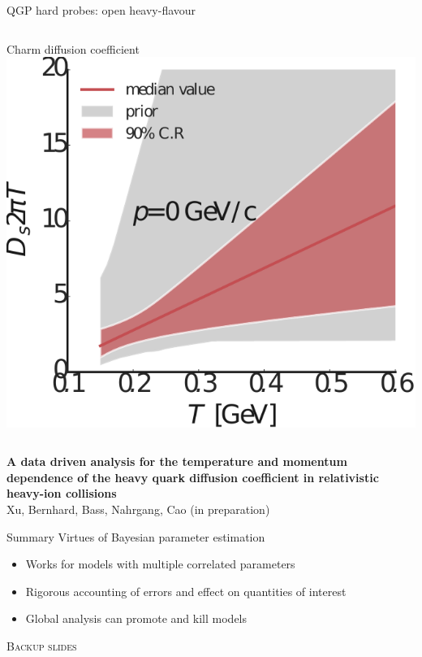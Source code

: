 \documentclass{beamer}
\begin{document}
\begin{frame}{QGP hard probes: open heavy-flavour}
\begin{columns}[T]
\begin{column}{.45\textwidth}
      \centering \small Charm diffusion coefficient\\[.5ex]
      \includegraphics[width=.9\textwidth]{Plot_D2piT_posterior_T}
    \end{column}
  \end{columns}
  \begin{flushleft}
    \scriptsize
    \textbf{A data driven analysis for the temperature and momentum dependence of the heavy quark diffusion coefficient in relativistic heavy-ion collisions}\\
    Xu, Bernhard, Bass, Nahrgang, Cao (in preparation)
  \end{flushleft}
\end{frame}

\begin{frame}{Summary}
  \large Virtues of Bayesian parameter estimation
  \begin{itemize}
    \normalsize
    \item Works for models with multiple correlated parameters
    \item Rigorous accounting of errors and effect on quantities of interest
    \item Global analysis can promote and kill models
  \end{itemize}
\end{frame}

\appendix

\begin{frame}
  \begin{center}
    \scshape Backup slides
  \end{center}
\end{frame}
\end{document}
